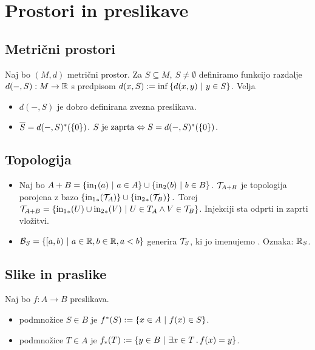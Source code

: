 \section{Prostori in preslikave}
\subsection{Metrični prostori}

Naj bo $(M, d)$ metrični prostor. Za $S \subseteq M, \ S \neq \emptyset$ definiramo funkcijo razdalje $d(-, S): M \to \mathbb{R}$ s predpisom $d(x, S) := \inf \left\{d(x,y) \ | \ y \in S\right\}$. Velja
\begin{itemize}
    \item $d(-, S)$ je dobro definirana zvezna preslikava.
    \item $\overline{S} = d(-, S)^*(\left\{0\right\})$. $S \text{ je zaprta} \Leftrightarrow S = d(-, S)^*(\left\{0\right\})$.
\end{itemize}

\subsection{Topologija}
\begin{itemize}
    \item Naj bo $A+ B = \left\{\text{in}_1(a) \ | \ a \in A\right\} \cup \left\{\text{in}_2(b) \ | \ b \in B\right\}$. $\mathcal{T}_{A+B}$ je topologija porojena z bazo $\left\{{\text{in}_1}_{*}(\mathcal{T}_A)\right\} \cup \left\{{\text{in}_2}_{*}(\mathcal{T}_B)\right\}.$ Torej $\mathcal{T}_{A+B} = \left\{{\text{in}_1}_{*}(U) \cup {\text{in}_2}_{*}(V) \ | \ U \in T_A \land V \in \mathcal{T}_B\right\}$. Injekciji sta odprti in zaprti vložitvi.
    \item $\mathcal{B}_S = \left\{[a, b) \ | \ a \in \mathbb{R}, b \in \mathbb{R}, a < b\right\}$ generira $\mathcal{T}_S$, ki jo imenujemo . Oznaka: $\mathbb{R}_S$.
\end{itemize}

\subsection{Slike in praslike}
\begin{definicija}
    Naj bo $f: A \to B$ preslikava.
    \begin{itemize}
        \item {} podmnožice $S \in B$ je $f^*(S) := \left\{x \in A \ | \ f(x) \in S\right\}$.
        \item {} podmnožice $T \in A$ je $f_*(T) := \left\{y \in B \ | \ \exists x \in T \,.\, f(x) = y\right\}$.
    \end{itemize}
\end{definicija}

